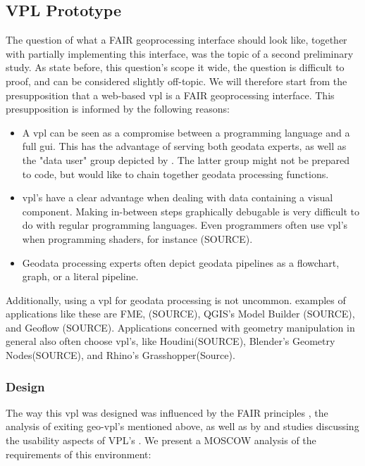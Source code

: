 \subsection{VPL Prototype}
\label{sec:preliminary-vpl}

The question of what a FAIR geoprocessing interface should look like, together with partially implementing this interface, was the topic of a second preliminary study. 
As state before, this question's scope it wide, the question is difficult to proof, and can be considered slightly off-topic. We will therefore start from the presupposition that a web-based \ac{vpl} is a FAIR geoprocessing interface. This presupposition is informed by the following reasons: 

\begin{itemize}
  \item A \ac{vpl} can be seen as a compromise between a programming language and a full \ac{gui}. This has the advantage of serving both geodata experts, as well as the "data user" group depicted by \cite{brink_geospatial_2018}. The latter group might not be prepared to code, but would like to chain together geodata processing functions.
  \item \ac{vpl}'s have a clear advantage when dealing with data containing a visual component. Making in-between steps graphically debugable is very difficult to do with regular programming languages. Even programmers often use \ac{vpl}'s when programming shaders, for instance (SOURCE). 
  \item Geodata processing experts often depict geodata pipelines as a flowchart, graph, or a literal pipeline. 
\end{itemize}

Additionally, using a \ac{vpl} for geodata processing is not uncommon. examples of applications like these are FME, (SOURCE), QGIS's Model Builder (SOURCE), and Geoflow (SOURCE). Applications concerned with geometry manipulation in general also often choose \ac{vpl}'s, like Houdini(SOURCE), Blender's Geometry Nodes(SOURCE), and Rhino's Grasshopper(Source).


\subsubsection*{Design}

The way this \ac{vpl} was designed was influenced by the FAIR principles \cite{mark_d_wilkinson_fair_2016}, the analysis of exiting geo-vpl's mentioned above, as well as by and studies discussing the usability aspects of VPL's \cite{green_usability_1996, peters_geoflow_2019}. We present a MOSCOW analysis of the requirements of this environment: 

